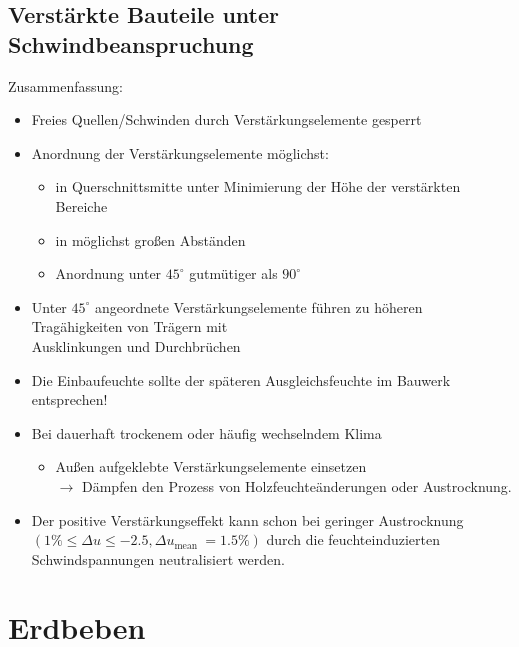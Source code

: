 \documentclass[fleqn,twoside]{article}
\begin{document}
    \subsection{Verstärkte Bauteile unter Schwindbeanspruchung}



        Zusammenfassung:
            \begin{itemize}
                \item Freies Quellen/Schwinden durch Verstärkungselemente gesperrt
                \item Anordnung der Verstärkungselemente möglichst:
                    \begin{itemize}
                        \item in Querschnittsmitte unter Minimierung der Höhe der verstärkten Bereiche
                        \item in möglichst großen Abständen
                        \item Anordnung unter $45^{\circ}$ gutmütiger als $90^{\circ}$
                    \end{itemize}
                \item Unter $45^{\circ}$ angeordnete Verstärkungselemente führen zu höheren Tragähigkeiten von Trägern mit \\ Ausklinkungen und Durchbrüchen
                \item Die Einbaufeuchte sollte der späteren Ausgleichsfeuchte im Bauwerk entsprechen!
                \item Bei dauerhaft trockenem oder häufig wechselndem Klima
                    \begin{itemize}
                        \item Außen aufgeklebte Verstärkungselemente einsetzen\\
                        $\rightarrow$ Dämpfen den Prozess von Holzfeuchteänderungen oder Austrocknung.
                    \end{itemize}
                \item Der positive Verstärkungseffekt kann schon bei geringer Austrocknung $\left(1 \% \leq \Delta u \leq-2.5, \Delta u_{\text {mean }}=1.5 \%\right)$ durch die feuchteinduzierten Schwindspannungen neutralisiert werden.
            \end{itemize}

    
\newpage
\section{Erdbeben}
\end{document}
